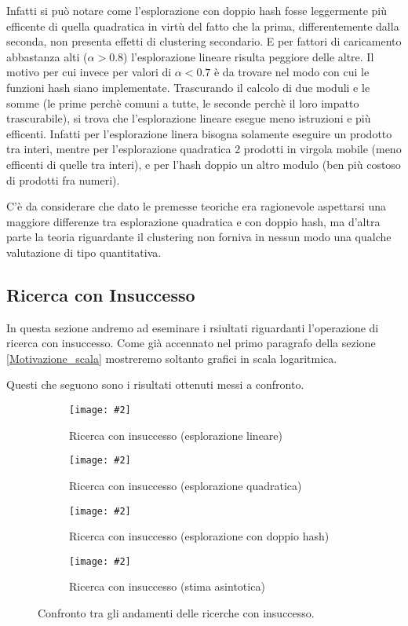 \documentclass{article}
\newcommand{\image}[3][1]{
	\centering
	\texttt{[image: \#2]}
	\caption{#3}
}
\begin{document}
Infatti si può notare come l'esplorazione con doppio hash fosse leggermente più efficente di quella quadratica in virtù del fatto che la prima, differentemente dalla seconda, non presenta effetti di clustering secondario. E per fattori di caricamento abbastanza alti ($\alpha > 0.8$) l'esplorazione lineare risulta peggiore delle altre. Il motivo per cui invece per valori di $\alpha < 0.7$ è da trovare nel modo con cui le funzioni hash siano implementate. Trascurando il calcolo di due moduli e le somme (le prime perchè comuni a tutte, le seconde perchè il loro impatto trascurabile), si trova che l'esplorazione lineare esegue meno istruzioni e più efficenti. Infatti per l'esplorazione linera bisogna solamente eseguire un prodotto tra interi, mentre per l'esplorazione quadratica 2 prodotti in virgola mobile (meno efficenti di quelle tra interi), e per l'hash doppio un altro modulo (ben più costoso di prodotti fra numeri).

C'è da considerare che dato le premesse teoriche era ragionevole aspettarsi una maggiore differenze tra esplorazione quadratica e con doppio hash, ma d'altra parte la teoria riguardante il clustering non forniva in nessun modo una qualche valutazione di tipo quantitativa.

\subsection{Ricerca con Insuccesso}
In questa sezione andremo ad eseminare i rsiultati riguardanti l'operazione di ricerca con insuccesso. Come già accennato nel primo paragrafo della sezione \ref{Motivazione_scala} mostreremo soltanto grafici in scala logaritmica.

Questi che seguono sono i risultati ottenuti messi a confronto.
\begin{figure}[H]
\begin{subfigure}[b]{0.5\textwidth}
\image{Insuccesso_Lineare_scala_logaritmica}{Ricerca con insuccesso (esplorazione lineare)}
\end{subfigure}
\begin{subfigure}[b]{0.5\textwidth}
\image{Insuccesso_Quadratico_scala_logaritmica}{Ricerca con insuccesso (esplorazione quadratica)}
\end{subfigure}
\begin{subfigure}[b]{0.5\textwidth}
\image{Insuccesso_Doppio_scala_logaritmica}{Ricerca con insuccesso (esplorazione con doppio hash)}
\end{subfigure}
\begin{subfigure}[b]{0.5\textwidth}
\image{Insuccesso_Asintotica_scala_logaritmica}{Ricerca con insuccesso (stima asintotica)}
\end{subfigure}
\caption{Confronto tra gli andamenti delle ricerche con insuccesso.}
\label{fig:Insuccesso_quartetto}
\end{figure}
\end{document}
